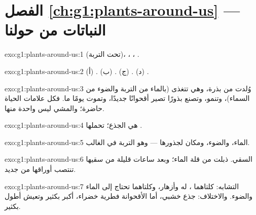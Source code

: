 \section*{الفصل \ref{ch:g1:plants-around-us} --- النباتات من حولنا}

\begin{solution}{exo:g1:plants-around-us:1}
 (تحت التربة)، ، ، .
\end{solution}

\begin{solution}{exo:g1:plants-around-us:2}
(أ) . (ب) . (ج) . (د) .
\end{solution}

\begin{solution}{exo:g1:plants-around-us:3}
وُلدت من بذرة، وهي تتغذى (بالماء من التربة والضوء من السماء)،
وتنمو، وتصنع بذورًا تصير أقحوانًا جديدًا، وتموت يومًا ما. فكل
علامات الحياة حاضرة؛ والمشي ليس واحدة منها.
\end{solution}

\begin{solution}{exo:g1:plants-around-us:4}
  هي الجذع؛  تحملها .
\end{solution}

\begin{solution}{exo:g1:plants-around-us:5}
الماء، والضوء، ومكان لجذورها --- وهو التربة في الغالب.
\end{solution}

\begin{solution}{exo:g1:plants-around-us:6}
السقي.  ذبلت من قلة الماء؛ وبعد ساعات قليلة من سقيها
تنتصب أوراقها من جديد.
\end{solution}

\begin{solution}{exo:g1:plants-around-us:7}
التشابه: كلتاهما ، له    وأزهار، وكلتاهما تحتاج
إلى الماء والضوء. والاختلاف:   جذع خشبي، أما 
الأقحوانة فطرية خضراء،  أكبر بكثير وتعيش أطول بكثير.
\end{solution}

